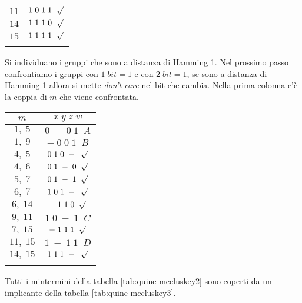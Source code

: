 \documentclass[a4paper]{article}
\theoremstyle{break}
\theoremstyle{break}
\theoremstyle{break}
\theoremstyle{break}
\begin{document}
\begin{example}
\begin{center}
\begin{tabular}{c|c}
           \( 11 \) & \( 1\;0\;1\;1\;\;\surd \)\\
           \( 14 \) & \( 1\;1\;1\;0\;\;\surd \)\\
           \hline
           \( 15 \) & \( 1\;1\;1\;1\;\;\surd \)\\
    \label{tab:quine-mccluskey2}
    \end{tabular}
   \end{center}
   Si individuano i gruppi che sono a distanza di Hamming 1. Nel prossimo passo
   confrontiamo i gruppi con \( 1\;bit=1 \) e con \( 2\;bit=1 \), se sono a 
   distanza di Hamming 1 allora si mette \emph{don't care} nel bit che cambia.
   Nella prima colonna c'è la coppia di \( m \) che viene confrontata. 
         \begin{center}
       \begin{tabular}{c|c}
           \( m \) & \( x\;y\;z\;w \)\\
           \hline
           \( 1,\; 5 \) & \( 0\;-\;0\;1\;\;A \)\\ 
           \( 1,\;9 \) & \( -\;0\;0\;1\;\;B \)\\
           \( 4,\;5 \) & \( 0\;1\;0\;-\;\;\surd \)\\
           \( 4,\;6 \) & \( 0\;1\;-\;0\;\;\surd \)\\
           \hline
           \( 5,\;7 \) & \( 0\;1\;-\;1\;\;\surd \)\\
           \( 6,\;7 \) & \( 1\;0\;1\;-\;\;\surd \)\\
           \( 6,\;14 \) & \( -\;1\;1\;0\;\;\surd \)\\
           \( 9,\;11 \) & \( 1\;0\;-\;1\;\;C \)\\
           \hline
           \( 7,\;15 \) & \( -\;1\;1\;1\;\;\surd \)\\
           \( 11,\;15 \) & \( 1\;-\;1\;1\;\;D \)\\
           \( 14,\;15 \) & \( 1\;1\;1\;-\;\;\surd \)\\
    \label{tab:quine-mccluskey3}
    \end{tabular}
   \end{center}
   Tutti i mintermini della tabella \ref{tab:quine-mccluskey2} sono coperti da un implicante
   della tabella \ref{tab:quine-mccluskey3}.


\end{example}
\end{document}

